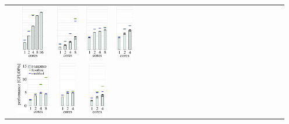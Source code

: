 \begin{tabular}{>{\scriptsize \bfseries}lcccccccccp{0.7cm}>{\scriptsize \bfseries}lccccccccccc}
  & 
  \includegraphics[height=2.3cm,clip=true]{images/perf/p-80/p-skylakesp2-omen-rgf-tc2_5-lc160}%
  & 
  \includegraphics[height=2.3cm,clip=true]{images/perf/p-80/p-knightmare1-omen-rgf-tc2_5-lc160}%
  & 
  \includegraphics[height=2.3cm,clip=true]{images/perf/p-80/p-summitridge1-omen-rgf-tc2_5-lc160}%
  & 
  \includegraphics[height=2.3cm,clip=true]{images/perf/p-80/p-naples1-omen-rgf-tc2_5-lc160}%
\\
 \raisebox{1.25cm}{\rotatebox[origin=c]{90}{lapl2}} &
  \includegraphics[height=2.3cm,clip=true]{images/perf/p-80/p-emmy-n-70-b-1}%
  & 
  \includegraphics[height=2.3cm,clip=true]{images/perf/p-80/p-woody-hsw-n-70-b-1}%
  & 
  \includegraphics[height=2.3cm,clip=true]{images/perf/p-80/p-hasep1-n-70-b-1}%

\end{tabular}

